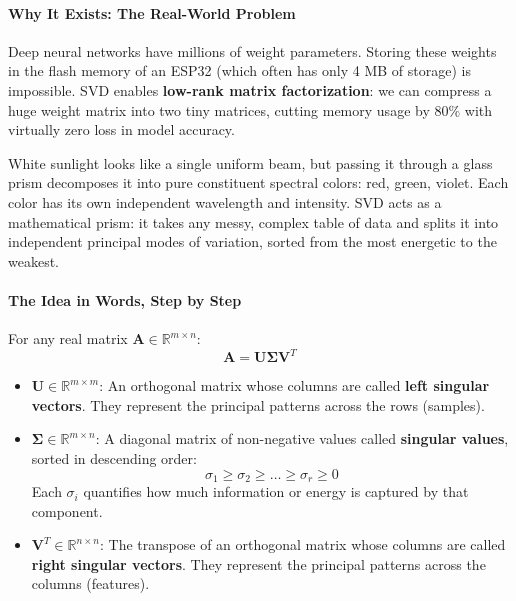\paragraph{Why It Exists: The Real-World Problem}
Deep neural networks have millions of weight parameters. Storing these weights in the flash memory of an ESP32 (which often has only 4 MB of storage) is impossible. SVD enables \textbf{low-rank matrix factorization}: we can compress a huge weight matrix into two tiny matrices, cutting memory usage by $80\%$ with virtually zero loss in model accuracy.

\begin{analogy}
White sunlight looks like a single uniform beam, but passing it through a glass prism decomposes it into pure constituent spectral colors: red, green, violet. Each color has its own independent wavelength and intensity. SVD acts as a mathematical prism: it takes any messy, complex table of data and splits it into independent principal modes of variation, sorted from the most energetic to the weakest.
\end{analogy}

\paragraph{The Idea in Words, Step by Step}
For any real matrix $\mathbf{A} \in \mathbb{R}^{m \times n}$:
\begin{equation}
\mathbf{A} = \mathbf{U} \mathbf{\Sigma} \mathbf{V}^T
\end{equation}
\begin{itemize}
    \item $\mathbf{U} \in \mathbb{R}^{m \times m}$: An orthogonal matrix whose columns are called \textbf{left singular vectors}. They represent the principal patterns across the rows (samples).
    \item $\mathbf{\Sigma} \in \mathbb{R}^{m \times n}$: A diagonal matrix of non-negative values called \textbf{singular values}, sorted in descending order:
    \begin{equation*}
    \sigma_1 \ge \sigma_2 \ge \dots \ge \sigma_r \ge 0
    \end{equation*}
    Each $\sigma_i$ quantifies how much information or energy is captured by that component.
    \item $\mathbf{V}^T \in \mathbb{R}^{n \times n}$: The transpose of an orthogonal matrix whose columns are called \textbf{right singular vectors}. They represent the principal patterns across the columns (features).
\end{itemize}


